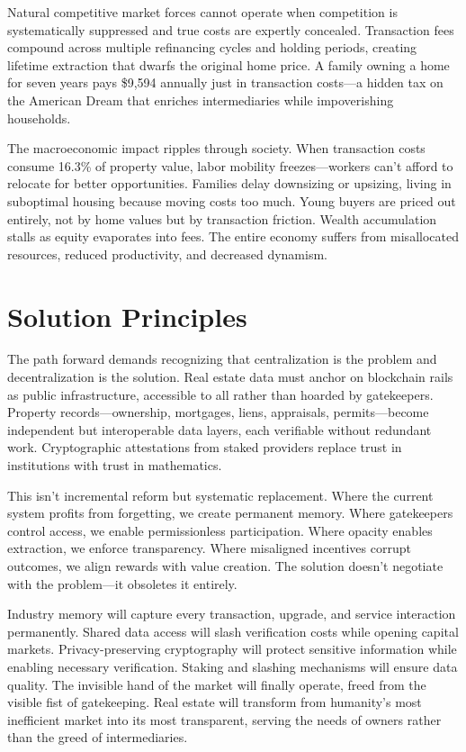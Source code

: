 Natural competitive market forces cannot operate when competition is systematically suppressed and true costs are expertly concealed. Transaction fees compound across multiple refinancing cycles and holding periods, creating lifetime extraction that dwarfs the original home price. A family owning a home for seven years pays \$9,594 annually just in transaction costs—a hidden tax on the American Dream that enriches intermediaries while impoverishing households.

The macroeconomic impact ripples through society. When transaction costs consume 16.3\% of property value, labor mobility freezes—workers can't afford to relocate for better opportunities. Families delay downsizing or upsizing, living in suboptimal housing because moving costs too much. Young buyers are priced out entirely, not by home values but by transaction friction. Wealth accumulation stalls as equity evaporates into fees. The entire economy suffers from misallocated resources, reduced productivity, and decreased dynamism.

\section{Solution Principles}

The path forward demands recognizing that centralization is the problem and decentralization is the solution. Real estate data must anchor on blockchain rails as public infrastructure, accessible to all rather than hoarded by gatekeepers. Property records—ownership, mortgages, liens, appraisals, permits—become independent but interoperable data layers, each verifiable without redundant work. Cryptographic attestations from staked providers replace trust in institutions with trust in mathematics.

This isn't incremental reform but systematic replacement. Where the current system profits from forgetting, we create permanent memory. Where gatekeepers control access, we enable permissionless participation. Where opacity enables extraction, we enforce transparency. Where misaligned incentives corrupt outcomes, we align rewards with value creation. The solution doesn't negotiate with the problem—it obsoletes it entirely.

Industry memory will capture every transaction, upgrade, and service interaction permanently. Shared data access will slash verification costs while opening capital markets. Privacy-preserving cryptography will protect sensitive information while enabling necessary verification. Staking and slashing mechanisms will ensure data quality. The invisible hand of the market will finally operate, freed from the visible fist of gatekeeping. Real estate will transform from humanity's most inefficient market into its most transparent, serving the needs of owners rather than the greed of intermediaries.